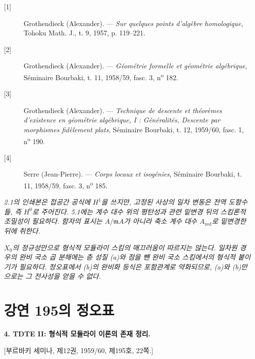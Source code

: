 \documentclass[11pt,twoside,openany]{book}
\numberwithin{equation}{section}
\newcommand{\sourceunit}{front}
\newcommand{\src}[1]{%
  \phantomsection\hypertarget{src:\sourceunit:#1}{}%
  \marginpar{\raggedleft\footnotesize\sffamily #1}%
}
\theoremstyle{plain}
\theoremstyle{definition}
\theoremstyle{remark}
\begin{document}
\begin{description}
  \item[{[1]}] Grothendieck (Alexander). --- \emph{Sur quelques points
    d'algèbre homologique}, Tohoku Math. J., t. 9, 1957, p. 119--221.
  \item[{[2]}] Grothendieck (Alexander). --- \emph{Géométrie formelle et
    géométrie algébrique}, Séminaire Bourbaki, t. 11, 1958/59, fasc. 3,
    n\textsuperscript{o} 182.
  \item[{[3]}] Grothendieck (Alexander). --- \emph{Technique de descente et
    théorèmes d'existence en géométrie algébrique, I : Généralités, Descente
    par morphismes fidèlement plats}, Séminaire Bourbaki, t. 12, 1959/60,
    fasc. 1, n\textsuperscript{o} 190.
  \item[{[4]}] Serre (Jean-Pierre). --- \emph{Corps locaux et isogénies},
    Séminaire Bourbaki, t. 11, 1958/59, fasc. 3, n\textsuperscript{o} 185.
\end{description}

\par\smallskip
\begingroup\footnotesize


\noindent\textit{2.1의 인쇄본은 접공간 공식에 $H^1$을 쓰지만, 고정된 사상의 일차 변동은 전역 도함수들, 즉 $H^0$로 주어진다. 5.1에는 계수 대수 위의 평탄성과 관련 밑변경 뒤의 스킴론적 조밀성이 필요하다. 함자의 표시는 $A/\mathfrak mA$가 아니라 축소 계수 대수 $A_{\mathrm{red}}$로 밑변경한 뒤에 취한다.}\par
\noindent\textit{$X_0$의 정규성만으로 형식적 모듈라이 스킴의 매끄러움이 따르지는 않는다. 일차원 경우의 완비 국소 곱 분해에는 층 성질 (a)와 점을 뺀 완비 국소 스킴에서의 형식적 붙이기가 필요하다. 정오표에서 (b)의 완비화 등식은 포함관계로 약화되므로, (a)와 (b)만으로는 그 전사성을 얻을 수 없다.}\par
\endgroup

\par
\renewcommand{\sourceunit}{e195}
\clearpage
\chapter*{강연 195의 정오표}
\setcounter{footnote}{0}
\src{300}

\noindent\textbf{4. TDTE II: 형식적 모듈라이 이론의 존재 정리.}

\begin{center}
[부르바키 세미나, 제12권, 1959/60, 제195호, 22쪽.]
\end{center}
\end{document}

